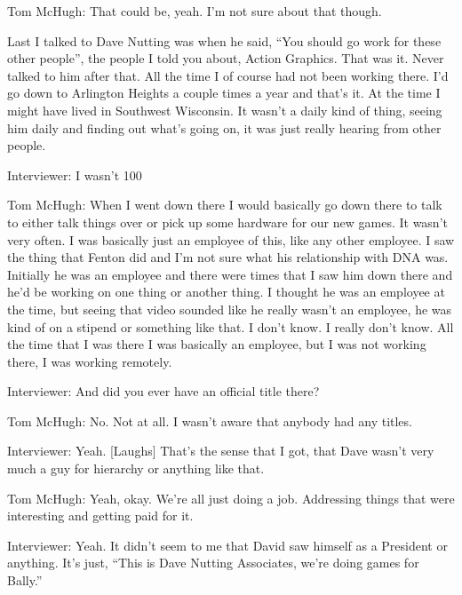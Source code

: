 \textcolor{interviewee}{Tom McHugh:} That could be, yeah. I’m not sure about that though. 

Last I talked to Dave Nutting was when he said, “You should go work for these other people”, the people I told you about, Action Graphics. That was it. Never talked to him after that. All the time I of course had not been working there. I’d go down to Arlington Heights a couple times a year and that’s it. At the time I might have lived in Southwest Wisconsin. It wasn’t a daily kind of thing, seeing him daily and finding out what’s going on, it was just really hearing from other people.

\textcolor{interviewer}{Interviewer:} I wasn’t 100%

\textcolor{interviewee}{Tom McHugh:} When I went down there I would basically go down there to talk to either talk things over or pick up some hardware for our new games. It wasn’t very often. I was basically just an employee of this, like any other employee. I saw the thing that Fenton did and I’m not sure what his relationship with DNA was. Initially he was an employee and there were times that I saw him down there and he’d be working on one thing or another thing. I thought he was an employee at the time, but seeing that video sounded like he really wasn’t an employee, he was kind of on a stipend or something like that. I don’t know. I really don’t know. All the time that I was there I was basically an employee, but I was not working there, I was working remotely.

\textcolor{interviewer}{Interviewer:} And did you ever have an official title there?

\textcolor{interviewee}{Tom McHugh:} No. Not at all. I wasn’t aware that anybody had any titles.

\textcolor{interviewer}{Interviewer:} Yeah. [Laughs] That’s the sense that I got, that Dave wasn’t very much a guy for hierarchy or anything like that.

\textcolor{interviewee}{Tom McHugh:} Yeah, okay. We’re all just doing a job. Addressing things that were interesting and getting paid for it.

\textcolor{interviewer}{Interviewer:} Yeah. It didn’t seem to me that David saw himself as a President or anything. It’s just, “This is Dave Nutting Associates, we’re doing games for Bally.”

